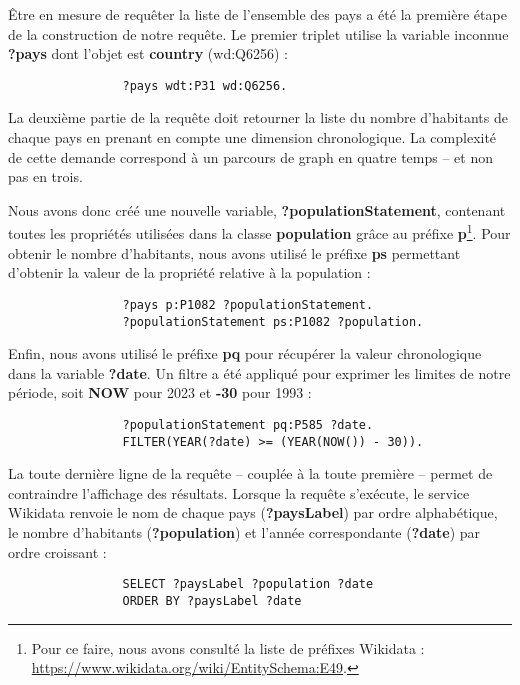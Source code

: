 \documentclass[hidelinks, 12pt]{article}
\begin{document}
			Être en mesure de requêter la liste de l'ensemble des pays a été la première étape de la construction de notre requête. Le premier triplet utilise la variable inconnue \textbf{?pays} dont l'objet est \textbf{country} (wd:Q6256) :
			
			\begin{verbatim}
				?pays wdt:P31 wd:Q6256.
			\end{verbatim}
			
			La deuxième partie de la requête doit retourner la liste du nombre d'habitants de chaque pays en prenant en compte une dimension chronologique. La complexité de cette demande correspond à un parcours de graph en quatre temps -- et non pas en trois.
			
			Nous avons donc créé une nouvelle variable, \textbf{?populationStatement}, contenant toutes les propriétés utilisées dans la classe \textbf{population} grâce au préfixe \textbf{p}\footnote{Pour ce faire, nous avons consulté la liste de préfixes Wikidata : \url{https://www.wikidata.org/wiki/EntitySchema:E49}.}. Pour obtenir le nombre d'habitants, nous avons utilisé le préfixe \textbf{ps} permettant d'obtenir la valeur de la propriété relative à la population :
			
			\begin{verbatim}
				?pays p:P1082 ?populationStatement.
				?populationStatement ps:P1082 ?population.
			\end{verbatim}
		
			Enfin, nous avons utilisé le préfixe \textbf{pq} pour récupérer la valeur chronologique dans la variable \textbf{?date}. Un filtre a été appliqué pour exprimer les limites de notre période, soit \textbf{NOW} pour 2023 et \textbf{-30} pour 1993 :
			
			\begin{verbatim}
				?populationStatement pq:P585 ?date.
				FILTER(YEAR(?date) >= (YEAR(NOW()) - 30)).
			\end{verbatim}
			
			La toute dernière ligne de la requête -- couplée à la toute première -- permet de contraindre l'affichage des résultats. Lorsque la requête s'exécute, le service Wikidata renvoie le nom de chaque pays (\textbf{?paysLabel}) par ordre alphabétique, le nombre d'habitants (\textbf{?population}) et l'année correspondante (\textbf{?date}) par ordre croissant :
			
			\begin{verbatim}
				SELECT ?paysLabel ?population ?date
				ORDER BY ?paysLabel ?date
			\end{verbatim}
		
\end{document}
